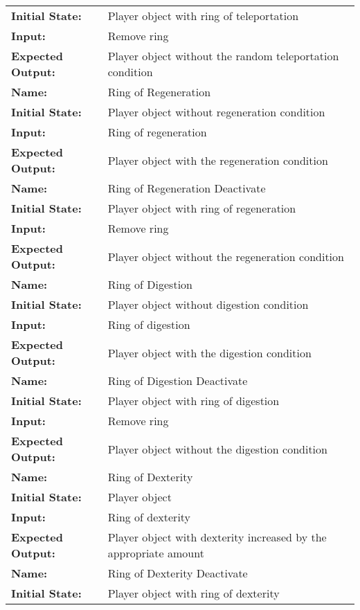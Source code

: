 \documentclass[12pt, titlepage]{article}
\begin{document}
\begin{center}
\begin{longtable}{ l | p{10cm} }
				\textbf{Initial State:} & Player object with ring of teleportation\\
				\textbf{Input:} & Remove ring\\
				\textbf{Expected Output:} & Player object without the random teleportation condition\\[1em]
				\hline
				\rule{0pt}{2em}\textbf{Name:} & Ring of Regeneration\\
				\textbf{Initial State:} & Player object without regeneration condition\\
				\textbf{Input:} & Ring of regeneration\\
				\textbf{Expected Output:} & Player object with the regeneration condition\\[1em]
				\hline
				\rule{0pt}{2em}\textbf{Name:} & Ring of Regeneration Deactivate\\
				\textbf{Initial State:} & Player object with ring of regeneration\\
				\textbf{Input:} & Remove ring\\
				\textbf{Expected Output:} & Player object without the regeneration condition\\[1em]
				\hline
				\rule{0pt}{2em}\textbf{Name:} & Ring of Digestion\\
				\textbf{Initial State:} & Player object without digestion condition\\
				\textbf{Input:} & Ring of digestion\\
				\textbf{Expected Output:} & Player object with the digestion condition\\[1em]
				\hline
				\rule{0pt}{2em}\textbf{Name:} & Ring of Digestion Deactivate\\
				\textbf{Initial State:} & Player object with ring of digestion\\
				\textbf{Input:} & Remove ring\\
				\textbf{Expected Output:} & Player object without the digestion condition\\[1em]
				\hline
				\rule{0pt}{2em}\textbf{Name:} & Ring of Dexterity\\
				\textbf{Initial State:} & Player object\\
				\textbf{Input:} & Ring of dexterity\\
				\textbf{Expected Output:} & Player object with dexterity increased by the appropriate amount\\[1em]
				\hline
				\rule{0pt}{2em}\textbf{Name:} & Ring of Dexterity Deactivate\\
				\textbf{Initial State:} & Player object with ring of dexterity\\

\end{longtable}
\end{center}
\end{document}

